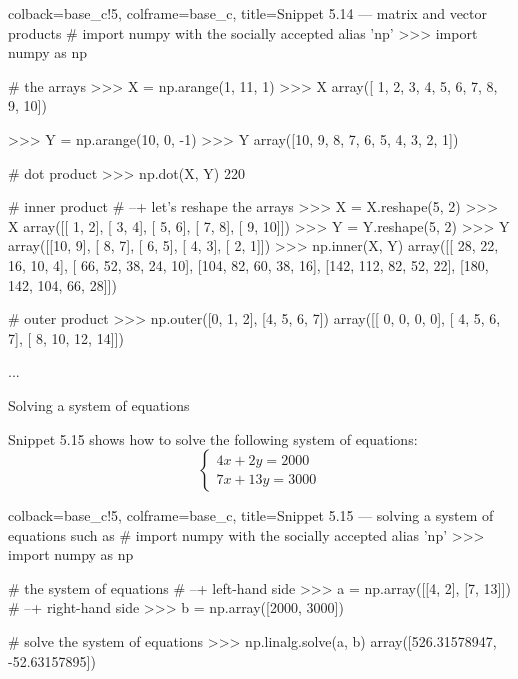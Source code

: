 \documentclass[a4paper,11pt]{book}
\newcommand{\question}[1]{%
    \begin{tcolorbox}[colback=comp_c!10,colframe=comp_c,sidebyside align=top,width=\linewidth,before skip=1ex]
        #1
    \end{tcolorbox}
    \switchcolumn%
}
\newcommand{\note}[1]{%
    \begin{tcolorbox}[colback=white!0,colframe=white!10,width=\linewidth,before skip=1ex]
        #1
    \end{tcolorbox}
}
\begin{document}
\begin{pythoncode}[linenos=true,]{colback=base_c!5, colframe=base_c, title=\sffamily Snippet 5.14 --- matrix and vector products}
# import numpy with the socially accepted alias 'np'
>>> import numpy as np

# the arrays
>>> X = np.arange(1, 11, 1)
>>> X
array([ 1,  2,  3,  4,  5,  6,  7,  8,  9, 10])

>>> Y = np.arange(10, 0, -1)
>>> Y
array([10,  9,  8,  7,  6,  5,  4,  3,  2,  1])

# dot product 
>>> np.dot(X, Y)
220

# inner product
# --+ let's reshape the arrays
>>> X = X.reshape(5, 2)
>>> X
array([[ 1,  2],
       [ 3,  4],
       [ 5,  6],
       [ 7,  8],
       [ 9, 10]])
>>> Y = Y.reshape(5, 2)
>>> Y
array([[10,  9],
       [ 8,  7],
       [ 6,  5],
       [ 4,  3],
       [ 2,  1]])
>>> np.inner(X, Y)
array([[ 28,  22,  16,  10,   4],
       [ 66,  52,  38,  24,  10],
       [104,  82,  60,  38,  16],
       [142, 112,  82,  52,  22],
       [180, 142, 104,  66,  28]])

# outer product
>>> np.outer([0, 1, 2], [4, 5, 6, 7])
array([[ 0,  0,  0,  0],
       [ 4,  5,  6,  7],
       [ 8, 10, 12, 14]])
\end{pythoncode}
...

\begin{paracol}{2}
\question{Solving a system of equations}
\note{Snippet 5.15 shows how to solve the following system of equations:
$$ \left\{
\begin{array}{lr}
4x + 2y = 2000\\
7x + 13y = 3000
\end{array}
\right. $$ 
}
\end{paracol}

\begin{pythoncode}[linenos=true,]{colback=base_c!5, colframe=base_c, title=\sffamily Snippet 5.15 --- solving a system of equations such as}
# import numpy with the socially accepted alias 'np'
>>> import numpy as np

# the system of equations
# --+ left-hand side
>>> a = np.array([[4, 2], [7, 13]])
# --+ right-hand side
>>> b = np.array([2000, 3000])

# solve the system of equations
>>> np.linalg.solve(a, b)
array([526.31578947, -52.63157895])

\end{pythoncode}
\clearpage
\end{document}
